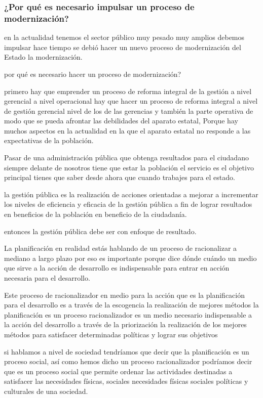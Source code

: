 \documentclass[
  jou,
  floatsintext,
  longtable,
  a4paper,
  nolmodern,
  notxfonts,
  notimes,
  12pt,
  colorlinks=true,linkcolor=blue,citecolor=blue,urlcolor=blue]{apa7}
\begin{document}
\subsubsection{¿Por qué es necesario impulsar un proceso de
modernización?}\label{por-quuxe9-es-necesario-impulsar-un-proceso-de-modernizaciuxf3n}

en la actualidad tenemos el sector público muy pesado muy amplios
debemos impulsar hace tiempo se debió hacer un nuevo proceso de
modernización del Estado la modernización.

por qué es necesario hacer un proceso de modernización?

primero hay que emprender un proceso de reforma integral de la gestión a
nivel gerencial a nivel operacional hay que hacer un proceso de reforma
integral a nivel de gestión gerencial nivel de los de las gerencias y
también la parte operativa de modo que se pueda afrontar las debilidades
del aparato estatal, Porque hay muchos aspectos en la actualidad en la
que el aparato estatal no responde a las expectativas de la población.

Pasar de una administración pública que obtenga resultados para el
ciudadano siempre delante de nosotros tiene que estar la población el
servicio es el objetivo principal tienes que saber desde ahora que
cuando trabajes para el estado.

la gestión pública es la realización de acciones orientadas a mejorar a
incrementar los niveles de eficiencia y eficacia de la gestión pública a
fin de lograr resultados en beneficios de la población en beneficio de
la ciudadanía.

entonces la gestión pública debe ser con enfoque de resultado.

La planificación en realidad estás hablando de un proceso de
racionalizar a mediano a largo plazo por eso es importante porque dice
dónde cuándo un medio que sirve a la acción de desarrollo es
indispensable para entrar en acción necesaria para el desarrollo.

Este proceso de racionalizador en medio para la acción que es la
planificación para el desarrollo es a través de la escogencia la
realización de mejores métodos la planificación es un proceso
racionalizador es un medio necesario indispensable a la acción del
desarrollo a través de la priorización la realización de los mejores
métodos para satisfacer determinadas políticas y lograr sus objetivos

si hablamos a nivel de sociedad tendríamos que decir que la
planificación es un proceso social, así como hemos dicho un proceso
racionalizador podríamos decir que es un proceso social que permite
ordenar las actividades destinadas a satisfacer las necesidades físicas,
sociales necesidades físicas sociales políticas y culturales de una
sociedad.
\end{document}
